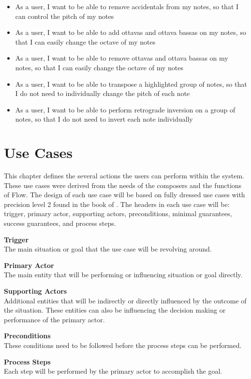 \begin{itemize}
    \item As a user, I want to be able to remove accidentals from my notes, so that I can control the pitch of my notes
    \item As a user, I want to be able to add ottavas and ottava bassas on my notes, so that I can easily change the octave of my notes
    \item As a user, I want to be able to remove ottavas and ottava bassas on my notes, so that I can easily change the octave of my notes
    \item As a user, I want to be able to transpose a highlighted group of notes, so that I do not need to individually change the pitch of each note
    \item As a user, I want to be able to perform retrograde inversion on a group of notes, so that I do not need to invert each note individually
  \end{itemize}

\chapter{Use Cases}

  This chapter defines the several actions the users can perform within the system. These use cases were derived from the needs of the composers and the functions of Flow. The design of each use case will be based on fully dressed use cases with precision level 2 found in the book of \cite{alistair2001writing}. The headers in each use case will be: trigger, primary actor, supporting actors, preconditions, minimal guarantees, success guarantees, and process steps.

  \textbf{Trigger} \\
  The main situation or goal that the use case will be revolving around. 

  \textbf{Primary Actor} \\
  The main entity that will be performing or influencing situation or goal directly.

  \textbf{Supporting Actors} \\
  Additional entities that will be indirectly or directly influenced by the outcome of the situation. These entities can also be influencing the decision making or performance of the primary actor.

  \textbf{Preconditions} \\
  These conditions need to be followed before the process steps can be performed.

  \textbf{Process Steps} \\
  Each step will be performed by the primary actor to accomplish the goal.

